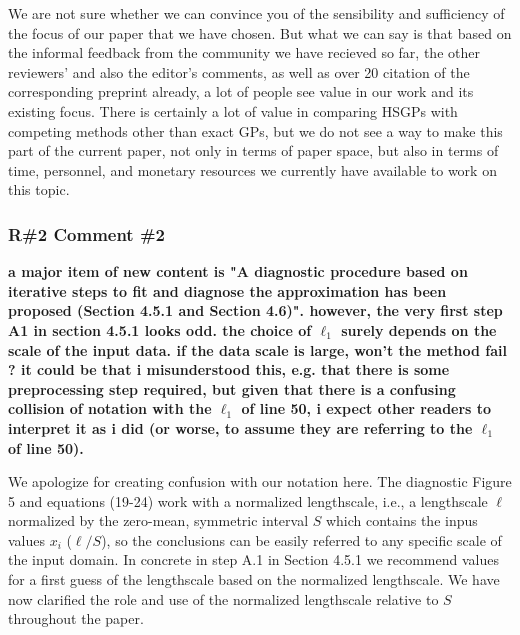 \documentclass[11pt]{report}
\begin{document}
We are not sure whether we can convince you of the sensibility and sufficiency of the focus of our paper that we have chosen. But what we can say is that based on the informal feedback from the community we have recieved so far, the other reviewers' and also the editor's comments, as well as over 20 citation of the corresponding preprint already, a lot of people see value in our work and its existing focus. There is certainly a lot of value in comparing HSGPs with competing methods other than exact GPs, but we do not see a way to make this part of the current paper, not only in terms of paper space, but also in terms of time, personnel, and monetary resources we currently have available to work on this topic.





\subsubsection*{R\#2 Comment \#2}

\textbf{a major item of new content is "A diagnostic procedure based on iterative steps to fit and diagnose the approximation has been proposed (Section 4.5.1 and Section 4.6)". however, the very first step A1 in section 4.5.1 looks odd. the choice of $\ell_1$ surely depends on the scale of the input data. if the data scale is large, won't the method fail ? it could be that i misunderstood this, e.g. that there is some preprocessing step required, but given that there is a confusing collision of notation with the $\ell_1$ of line 50, i expect other readers to interpret it as i did (or worse, to assume they are referring to the $\ell_1$ of line 50).}

We apologize for creating confusion with our notation here. {\color{blue}The diagnostic Figure 5 and equations (19-24) work with a normalized lengthscale, i.e., a lengthscale $\ell$ normalized by the zero-mean, symmetric interval $S$ which contains the inpus values $x_i$ ($\ell/S$), so the conclusions can be easily referred to any specific scale of the input domain. In concrete in step A.1 in Section 4.5.1 we recommend values for a first guess of the lengthscale based on the normalized lengthscale. We have now clarified the role and use of the normalized lengthscale relative to $S$ throughout the paper.}
\end{document}
